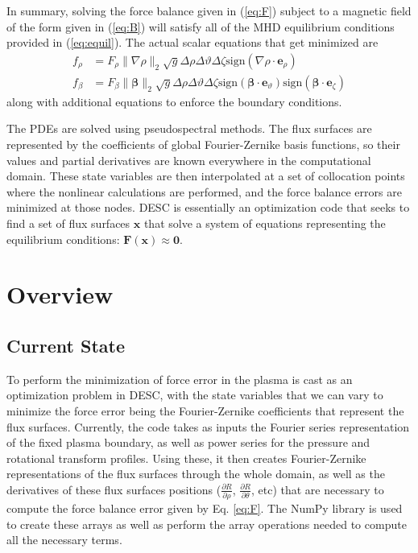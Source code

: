 \documentclass{article}
\newcommand{\er}{{\mathbf e}_{\rho}}
\newcommand{\ev}{{\mathbf e}_{\vartheta}}
\newcommand{\ez}{{\mathbf e}_{\zeta}}
\begin{document}
In summary, solving the force balance given in (\ref{eq:F}) subject to a magnetic field of the form given in (\ref{eq:B}) will satisfy all of the MHD equilibrium conditions provided in (\ref{eq:equil}).
The actual scalar equations that get minimized are
%
\begin{subequations}
  \begin{align}
    f_\rho &= F_\rho \lVert\nabla\rho\rVert_2 \sqrt{g} \Delta\rho\Delta\vartheta\Delta\zeta \text{sign}\left(\nabla\rho\cdot\er\right) \\
    f_\beta &= F_\beta \lVert\mathbf{\beta}\rVert_2 \sqrt{g} \Delta\rho\Delta\vartheta\Delta\zeta \text{sign}\left(\mathbf{\beta}\cdot\ev\right) \text{sign}\left(\mathbf{\beta}\cdot\ez\right)
  \end{align}
\end{subequations}
%
along with additional equations to enforce the boundary conditions.

The PDEs are solved using pseudospectral methods.
The flux surfaces are represented by the coefficients of global Fourier-Zernike basis functions, so their values and partial derivatives are known everywhere in the computational domain.
These state variables are then interpolated at a set of collocation points where the nonlinear calculations are performed, and the force balance errors are minimized at those nodes.
DESC is essentially an optimization code that seeks to find a set of flux surfaces $\mathbf{x}$ that solve a system of equations representing the equilibrium conditions: $\mathbf{F}(\mathbf{x}) \approx \mathbf{0}$.

\section{Overview} %

\subsection{Current State}

To perform the minimization of force error in the plasma is cast as an optimization problem in DESC, with the state variables that we can vary to minimize the force error being the Fourier-Zernike coefficients that represent the flux surfaces.
Currently, the code takes as inputs the Fourier series representation of the fixed plasma boundary, as well as power series for the pressure and rotational transform profiles.
Using these, it then creates Fourier-Zernike representations of the flux surfaces through the whole domain, as well as the derivatives of these flux surfaces positions ($\frac{\partial R}{\partial \rho}$, $\frac{\partial R}{\partial \theta}$, etc) that are necessary to compute the force balance error given by Eq. \eqref{eq:F}.
The NumPy \cite{NumPy} library is used to create these arrays as well as perform the array operations needed to compute all the necessary terms.
\end{document}
